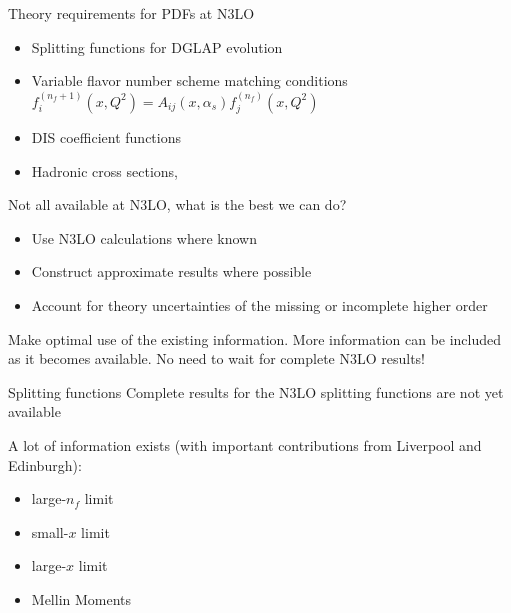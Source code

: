 \documentclass[aspectratio=169, 9pt,t]{beamer}
\begin{document}
\begin{frame}{Theory requirements for PDFs at N3LO}
  \begin{itemize}
    \item Splitting functions for DGLAP evolution \\

    \item Variable flavor number scheme matching conditions \\
    $ f_i^{\left(n_f+1\right)}\left(x, Q^2\right)=A_{i j}\left(x, \alpha_s\right) f_j^{\left(n_f\right)}\left(x, Q^2\right) $
    \item DIS coefficient functions
    \item Hadronic cross sections,
  \end{itemize}

  Not all available at N3LO, what is the best we can do?
  \begin{itemize}
    \item Use N3LO calculations where known
    \item Construct approximate results where possible
    \item Account for theory uncertainties of the missing or incomplete higher order
  \end{itemize}

  Make optimal use of the existing information. More information can be included as it becomes available. No need to wait for complete N3LO results!
\end{frame}


\begin{frame}{Splitting functions}
  Complete results for the N3LO splitting functions are not yet available

  A lot of information exists (with important contributions from Liverpool and Edinburgh):
  \begin{itemize}
    \item large-$n_f$ limit
    \item small-$x$ limit
    \item large-$x$ limit
    \item Mellin Moments
  \end{itemize}
\end{frame}
\end{document}
